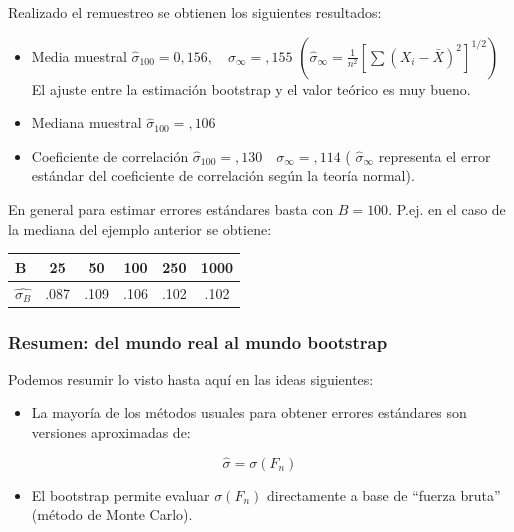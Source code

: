 \documentclass[
]{article}
\providecommand{\tightlist}{%
  \setlength{\itemsep}{0pt}\setlength{\parskip}{0pt}}
\begin{document}
Realizado el remuestreo se obtienen los siguientes resultados:

\begin{itemize}
\tightlist
\item
  Media muestral
  \(\hat{\sigma}_{100}=0,156, \quad \sigma_{\infty}=, 155\)
  \(\left(\hat{\sigma}_{\infty}=\frac{1}{n^{2}}\left[\sum\left(X_{i}-\bar{X}\right)^{2}\right]^{1 / 2}\right)\)
  El ajuste entre la estimación bootstrap y el valor teórico es muy bueno.
\item
  Mediana muestral
  \(\hat{\sigma}_{100}=, 106\)
\item
  Coeficiente de correlación
  \(\hat{\sigma}_{100}=, 130 \quad \sigma_{\infty}=, 114\)
  ( \(\hat{\sigma}_{\infty}\) representa el error estándar del coeficiente de correlación según la teoría normal).
\end{itemize}

En general para estimar errores estándares basta con \(B=100\). P.ej. en el caso de la mediana del ejemplo anterior se obtiene:

\begin{longtable}[]{@{}lccccc@{}}
\toprule\noalign{}
B & 25 & 50 & 100 & 250 & 1000 \\
\midrule\noalign{}
\endhead
\bottomrule\noalign{}
\endlastfoot
\(\widehat{\sigma_{B}}\) & .087 & .109 & .106 & .102 & .102 \\
\end{longtable}

\subsubsection{Resumen: del mundo real al mundo bootstrap}\label{resumen-del-mundo-real-al-mundo-bootstrap}

Podemos resumir lo visto hasta aquí en las ideas siguientes:

\begin{itemize}
\tightlist
\item
  La mayoría de los métodos usuales para obtener errores estándares son versiones aproximadas de:
\end{itemize}

\[
\hat{\sigma}=\sigma\left(F_{n}\right)
\]

\begin{itemize}
\tightlist
\item
  El bootstrap permite evaluar \(\sigma\left(F_{n}\right)\) directamente a base de ``fuerza bruta'' (método de Monte Carlo).
\end{itemize}
\end{document}
